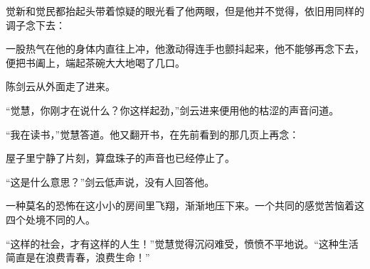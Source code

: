 \par 觉新和觉民都抬起头带着惊疑的眼光看了他两眼，但是他并不觉得，依旧用同样的调子念下去：
\par 一股热气在他的身体内直往上冲，他激动得连手也颤抖起来，他不能够再念下去，便把书阖上，端起茶碗大大地喝了几口。
\par 陈剑云从外面走了进来。
\par “觉慧，你刚才在说什么？你这样起劲，”剑云进来便用他的枯涩的声音问道。
\par “我在读书，”觉慧答道。他又翻开书，在先前看到的那几页上再念：
\par 屋子里宁静了片刻，算盘珠子的声音也已经停止了。
\par “这是什么意思？”剑云低声说，没有人回答他。
\par 一种莫名的恐怖在这小小的房间里飞翔，渐渐地压下来。一个共同的感觉苦恼着这四个处境不同的人。
\par “这样的社会，才有这样的人生！”觉慧觉得沉闷难受，愤愤不平地说。“这种生活简直是在浪费青春，浪费生命！”
